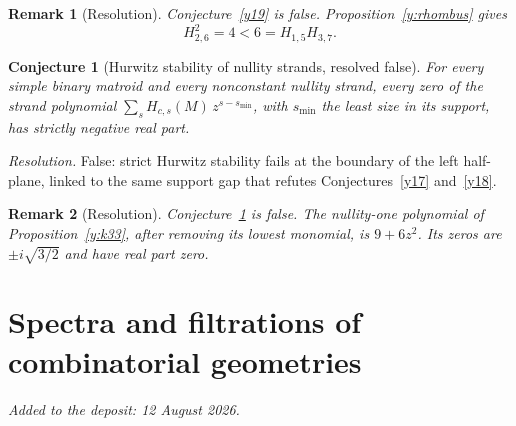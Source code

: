 \documentclass[11pt]{article}
\newtheorem{conjecture}{Conjecture}
\newtheorem{remark}{Remark}
\theoremstyle{definition}
\begin{document}
\begin{remark}[Resolution]\label{y19:res}
Conjecture~\ref{y19} is false.  Proposition~\ref{y:rhombus} gives
\[
H_{2,6}^2=4<6=H_{1,5}H_{3,7}.
\]
\end{remark}

\begin{conjecture}[Hurwitz stability of nullity strands, resolved false]\label{y20}
For every simple binary matroid and every nonconstant nullity strand, every zero of the strand polynomial $\sum_sH_{c,s}(M)\,z^{s-s_{\min}}$, with $s_{\min}$ the least size in its support, has strictly negative real part.
\end{conjecture}

\emph{Resolution.} False: strict Hurwitz stability fails at the boundary of the left half-plane, linked to the same support gap that refutes Conjectures~\ref{y17} and~\ref{y18}.

\begin{remark}[Resolution]\label{y20:res}
Conjecture~\ref{y20} is false.  The nullity-one polynomial of Proposition~\ref{y:k33}, after removing its lowest monomial, is $9+6z^2$.  Its zeros are $\pm i\sqrt{3/2}$ and have real part zero.
\end{remark}

\part{Spectra and filtrations of combinatorial geometries}

\medskip\noindent\emph{Added to the deposit: 12 August 2026.}\par\medskip
\end{document}
